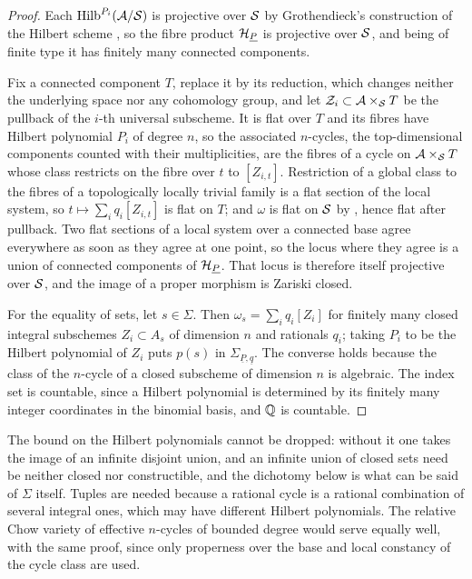 \begin{proof}
Each $\operatorname{Hilb}^{P_{i}}(\mathcal{A}/\mathcal{S})$ is projective over $\mathcal{S}$ by Grothendieck's
construction of the Hilbert scheme \cite{Gro61}, so the fibre product
$\mathcal{H}_{\underline{P}}$ is
projective over $\mathcal{S}$, and being of finite type it has finitely many connected
components.

Fix a connected component $T$, replace it by its reduction, which changes
neither the underlying space nor any cohomology group, and let
$\mathcal{Z}_{i}\subset\mathcal{A}\times_{\mathcal{S}}T$ be the pullback of the $i$-th universal
subscheme. It is flat over $T$ and its fibres have Hilbert polynomial $P_{i}$
of degree $n$, so the associated $n$-cycles, the top-dimensional components
counted with their multiplicities, are the fibres of a cycle on
$\mathcal{A}\times_{\mathcal{S}}T$ whose class restricts on the fibre over $t$ to $[Z_{i,t}]$.
Restriction of a global class to the fibres of a topologically
locally trivial family is a flat section of the local system, so
$t\mapsto\sum_{i}q_{i}[Z_{i,t}]$ is flat on $T$; and $\omega$ is flat on $\mathcal{S}$
by , hence flat after pullback. Two flat sections of a
local system over a connected base agree everywhere as soon as they agree at
one point, so the locus where they agree is a union of connected components of
$\mathcal{H}_{\underline{P}}$. That locus is therefore itself projective over $\mathcal{S}$,
and the image of a proper morphism is Zariski closed.

For the equality of sets, let $s\in\Sigma$. Then
$\omega_{s}=\sum_{i}q_{i}[Z_{i}]$ for finitely many closed integral subschemes
$Z_{i}\subset A_{s}$ of dimension $n$ and rationals $q_{i}$; taking
$P_{i}$ to be the Hilbert polynomial of $Z_{i}$ puts $p(s)$ in
$\Sigma_{\underline{P},\underline{q}}$. The converse holds because the class
of the $n$-cycle of a closed subscheme of dimension $n$ is algebraic. The
index set is countable, since a Hilbert polynomial is determined by its
finitely many integer coordinates in the binomial basis, and $\mathbb{Q}$ is
countable.
\end{proof}

The bound on the Hilbert polynomials cannot be dropped: without it one takes
the image of an infinite disjoint union, and an infinite union of closed sets
need be neither closed nor constructible, and the dichotomy below is what
can be said of $\Sigma$ itself. Tuples are needed because a rational cycle is a rational combination
of several integral ones, which may have different Hilbert polynomials. The
relative Chow variety of effective $n$-cycles of bounded degree would serve
equally well, with the same proof, since only properness over the base and
local constancy of the cycle class are used.


